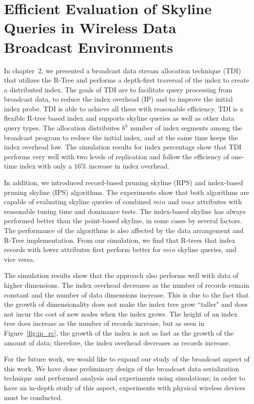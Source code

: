 \section{Efficient Evaluation of Skyline Queries in Wireless Data Broadcast Environments}

In chapter~2, we presented a broadcast data stream allocation technique (TDI) that utilizes the R-Tree and performs a depth-first traversal of the index to create a distributed index. The goals of TDI are to facilitate query processing from broadcast data, to reduce the index overhead (IP) and to improve the initial index probe. TDI is able to achieve all these with reasonable efficiency. TDI is a flexible R-tree based index and supports skyline queries as well as other data query types. The allocation distributes $b^h$ number of index segments among the broadcast program to reduce the initial index, and at the same time keeps the index overhead low. The simulation results for index percentage show that TDI performs very well with two levels of replication and follow the efficiency of one-time index with only a $16\%$ increase in index overhead.

In addition, we introduced record-based pruning skyline (RPS) and index-based pruning skyline (IPS) algorithms. The experiments show that both algorithms are capable of evaluating skyline queries of combined $min$ and $max$ attributes with reasonable tuning time and dominance tests. The index-based skyline has always performed better than the point-based skyline, in some cases by several factors. The performance of the algorithms is also affected by the data arrangement and R-Tree implementation. From our simulation, we find that R-trees that index records with lower attributes first perform better for $min$ skyline queries, and vice versa.

The simulation results show that the approach also performs well with data of higher dimensions. The index overhead decreases as the number of records remain constant and the number of data dimensions increase. This is due to the fact that the growth of dimensionality does not make the index tree grow ``taller" and does not incur the cost of new nodes when the index grows. The height of an index tree does increase as the number of records increase, but as seen in Figure~\ref{fig:ip_rc}, the growth of the index is not as fast as the growth of the amount of data; therefore, the index overhead decreases as records increase.

For the future work, we would like to expand our study of the broadcast aspect of this work. We have done preliminary design of the broadcast data serialization technique and performed analysis and experiments using simulations; in order to have an in-depth study of this aspect, experiments with physical wireless devices must be conducted.

